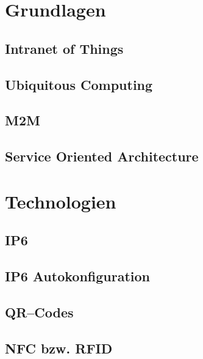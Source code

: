 \section{Grundlagen}
\label{sec:grundlagen}

\subsection{Intranet of Things}
\subsection{Ubiquitous Computing}
\subsection{M2M}
\subsection{Service Oriented Architecture}
\subsection{}

\section{Technologien}
\label{sec:technologien}

\subsection{IP6}
\subsection{IP6 Autokonfiguration}
\subsection{QR–Codes}
\subsection{NFC bzw. RFID}
\subsection{}
\subsection{}
